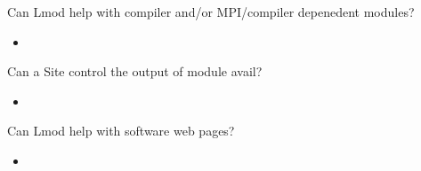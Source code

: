 \documentclass{beamer}
\begin{document}
\begin{frame}{Can Lmod help with compiler and/or MPI/compiler
      depenedent modules?}
  \begin{itemize}
    \item 
  \end{itemize}
\end{frame}

\begin{frame}{Can a Site control the output of module avail?}
  \begin{itemize}
    \item 
  \end{itemize}
\end{frame}

\begin{frame}{Can Lmod help with software web pages?}
  \begin{itemize}
    \item 
  \end{itemize}
\end{frame}






\end{document}

